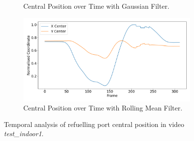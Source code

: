 \documentclass[12pt,oneside]{book} %
\begin{document}
\begin{figure}[H]
\begin{subfigure}[t]{0.60\textwidth}
        \caption{Central Position over Time with Gaussian Filter.}
        \label{fig:central-position-test-indoor1-gaussian}
    \end{subfigure}
    \hfill
    \begin{subfigure}[t]{0.60\textwidth}
        \includegraphics[width=\textwidth]{figures/bbox_metrics/test_indoor1 (Rolling Mean Filter)_central_position.png}
        \caption{Central Position over Time with Rolling Mean Filter.}
        \label{fig:central-position-test-indoor1-rolling}
    \end{subfigure}
    \caption{Temporal analysis of refuelling port central position in video \textit{test\_indoor1}.}
    \label{fig:central-position-test-indoor1}
\end{figure}
\end{document}
